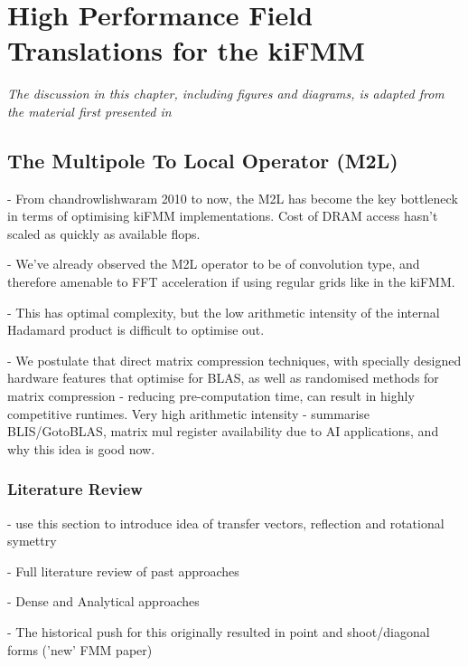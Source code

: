 \chapter{High Performance Field Translations for the kiFMM}\label{chpt:field_translation}
\thispagestyle{chaptertitle} %

\begin{center}
    \textit{The discussion in this chapter, including figures and diagrams, is adapted from the material first presented in \cite{kailasa2024m2ltranslationoperatorskernel} }
\end{center}

\section{The Multipole To Local Operator (M2L)}

- From chandrowlishwaram 2010 to now, the M2L has become the key bottleneck in terms of optimising kiFMM implementations. Cost of DRAM access hasn't scaled as quickly as available flops.

- We've already observed the M2L operator to be of convolution type, and therefore amenable to FFT acceleration if using regular grids like in the kiFMM.

- This has optimal complexity, but the low arithmetic intensity of the internal Hadamard product is difficult to optimise out.

- We postulate that direct matrix compression techniques, with specially designed hardware features that optimise for BLAS, as well as randomised methods for matrix compression - reducing pre-computation time, can result in highly competitive runtimes. Very high arithmetic intensity
- summarise BLIS/GotoBLAS, matrix mul register availability due to AI applications, and why this idea is good now.


\subsection{Literature Review}

- use this section to introduce idea of transfer vectors, reflection and rotational symettry

- Full literature review of past approaches

- Dense and Analytical approaches

- The historical push for this originally resulted in point and shoot/diagonal forms ('new' FMM paper)

